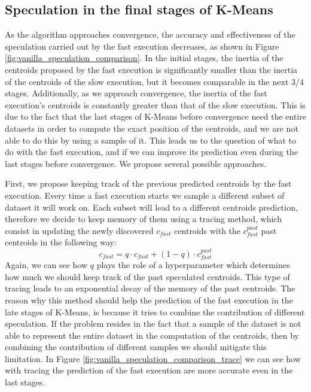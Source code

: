 \subsection{Speculation in the final stages of K-Means}
\label{section:final_stages}
As the algorithm approaches convergence, the accuracy and effectiveness of the speculation carried out by the fast execution decreases, as shown in Figure \ref{fig:vanilla_speculation_comparison}. In the initial stages, the inertia of the centroids proposed by the fast execution is significantly smaller than the inertia of the centroids of the slow execution, but it becomes comparable in the next 3/4 stages. Additionally, as we approach convergence, the inertia of the fast execution's centroids is constantly greater than that of the slow execution.
This is due to the fact that the last stages of K-Means before convergence need the entire datasets in order to compute the exact position of the centroids, and we are not able to do this by using a sample of it.
This leads us to the question of what to do with the fast execution, and if we can improve its prediction even during the last stages before convergence.
We propose several possible approaches.

First, we propose keeping track of the previous predicted centroids by the fast execution. Every time a fast execution starts we sample a different subset of dataset it will work on.
Each subset will lead to a different centroids prediction, therefore we decide to keep memory of them using a tracing method, which consist in updating the newly discovered $c_{fast}$ centroids with the $c_{fast}^{past}$ past centroids in the following way:
\begin{equation}
c_{fast} = q \cdot c_{fast} + (1-q) \cdot c_{fast}^{past}
\end{equation}
Again, we can see how $q$ plays the role of a hyperparameter which determines how much we should keep track of the past speculated centroids.
This type of tracing leads to an exponential decay of the memory of the past centroids.
The reason why this method should help the prediction of the fast execution in the late stages of K-Means, is because it tries to combine the contribution of different speculation. If the problem resides in the fact that a sample of the dataset is not able to represent the entire dataset in the computation of the centroids, then by combining the contribution of different samples we should mitigate this limitation. In Figure \ref{fig:vanilla_speculation_comparison_trace} we can see how with tracing the prediction of the fast execution are more accurate even in the last stages.

